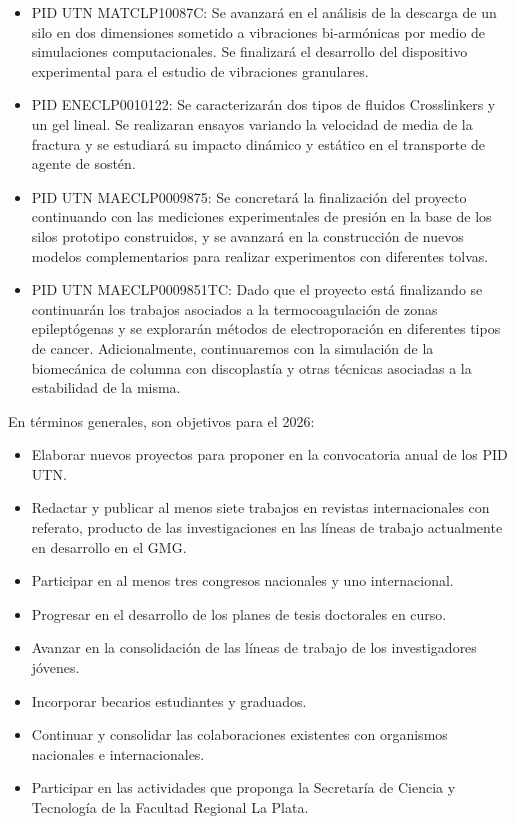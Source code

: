 \documentclass[a4paper,11pt,twoside,final,titlepage,onecolumn,openright]{report}
\begin{document}
\begin{itemize}
	\item PID UTN MATCLP10087C: Se avanzará en el análisis de la descarga de un silo en dos dimensiones sometido a vibraciones bi-armónicas por medio de simulaciones computacionales. Se finalizará el desarrollo del dispositivo experimental para el estudio de vibraciones granulares.
	\item PID ENECLP0010122: Se caracterizarán dos tipos de fluidos Crosslinkers y un gel lineal. Se realizaran ensayos variando la velocidad de media de la fractura y se estudiará su impacto dinámico y estático en el transporte de agente de sostén. 
  \item PID UTN MAECLP0009875: Se concretará la finalización del proyecto continuando con las mediciones experimentales de presión en la base de los silos prototipo construidos, y se avanzará en la construcción de nuevos modelos complementarios para realizar experimentos con diferentes tolvas.
  \item PID UTN MAECLP0009851TC: Dado que el proyecto está finalizando se continuarán los trabajos asociados a la termocoagulación de zonas epileptógenas y se explorarán métodos de electroporación en diferentes tipos de cancer. Adicionalmente, continuaremos con la simulación de la biomecánica de columna con discoplastía y otras técnicas asociadas a la estabilidad de la misma.
\end{itemize}

En términos generales, son objetivos para el 2026:
\begin{itemize}
  \item Elaborar nuevos proyectos para proponer en la convocatoria anual de los PID UTN.
	\item  Redactar y publicar al menos siete trabajos en revistas internacionales con referato, producto de las investigaciones en las líneas de trabajo actualmente en desarrollo en el GMG.
	\item  Participar en al menos tres congresos nacionales y uno internacional.
	\item  Progresar en el desarrollo de los planes de tesis doctorales en curso.
	\item  Avanzar en la consolidación de las líneas de trabajo de los investigadores jóvenes.
	\item  Incorporar becarios estudiantes y graduados.
	\item  Continuar y consolidar las colaboraciones existentes con organismos nacionales e internacionales.
	\item  Participar en las actividades que proponga la Secretaría de Ciencia y Tecnología de la Facultad Regional La Plata.
\end{itemize}
\end{document}
